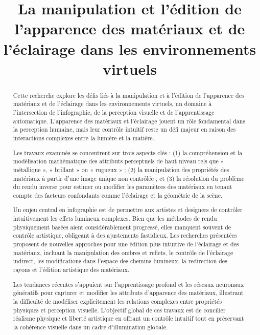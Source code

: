\documentclass[runningheads]{llncs}
\begin{document}
%
\title{La manipulation et l’édition de l’apparence des matériaux et de l’éclairage dans les environnements virtuels}
%
%

%

%
%
\maketitle              %
%
\begin{abstract}
Cette recherche explore les défis liés à la manipulation et à l’édition de l’apparence des matériaux et de l’éclairage dans les environnements virtuels, un domaine à l’intersection de l’infographie, de la perception visuelle et de l’apprentissage automatique. L’apparence des matériaux et l’éclairage jouent un rôle fondamental dans la perception humaine, mais leur contrôle intuitif reste un défi majeur en raison des interactions complexes entre la lumière et la matière.

Les travaux examinés se concentrent sur trois aspects clés : (1) la compréhension et la modélisation mathématique des attributs perceptuels de haut niveau tels que « métallique », « brillant » ou « rugueux » ; (2) la manipulation des propriétés des matériaux à partir d’une image unique non contrôlée ; et (3) la résolution du problème du rendu inverse pour estimer ou modifier les paramètres des matériaux en tenant compte des facteurs confondants comme l’éclairage et la géométrie de la scène.

Un enjeu central en infographie est de permettre aux artistes et designers de contrôler intuitivement les effets lumineux complexes. Bien que les méthodes de rendu physiquement basées aient considérablement progressé, elles manquent souvent de contrôle artistique, obligeant à des ajustements fastidieux. Les recherches présentées proposent de nouvelles approches pour une édition plus intuitive de l’éclairage et des matériaux, incluant la manipulation des ombres et reflets, le contrôle de l’éclairage indirect, les modifications dans l’espace des chemins lumineux, la redirection des rayons et l’édition artistique des matériaux.

Les tendances récentes s’appuient sur l’apprentissage profond et les réseaux neuronaux génératifs pour capturer et modifier les attributs d’apparence des matériaux, illustrant la difficulté de modéliser explicitement les relations complexes entre propriétés physiques et perception visuelle. L’objectif global de ces travaux est de concilier réalisme physique et liberté artistique en offrant un contrôle intuitif tout en préservant la cohérence visuelle dans un cadre d’illumination globale.

\end{abstract}
%
%
%
\newpage
\end{document}

